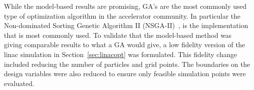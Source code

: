  \label{sec:ga}
While the model-based results are promising, 
GA's are the most commonly used type of optimization algorithm in the accelerator community.
In particular the Non-dominated Sorting Genetic Algorithm II (NSGA-II)~\cite{NSGA}, 
is the implementation that is most commonly used.
To validate that the model-based method was giving comparable results to what a GA would give, 
a low fidelity version of the linac simulation in Section~\ref{sec:linacopt} was formulated.
This fidelity change included reducing the number of particles and grid points. 
The boundaries on the design variables were also reduced to ensure only 
feasible simulation points were evaluated.


